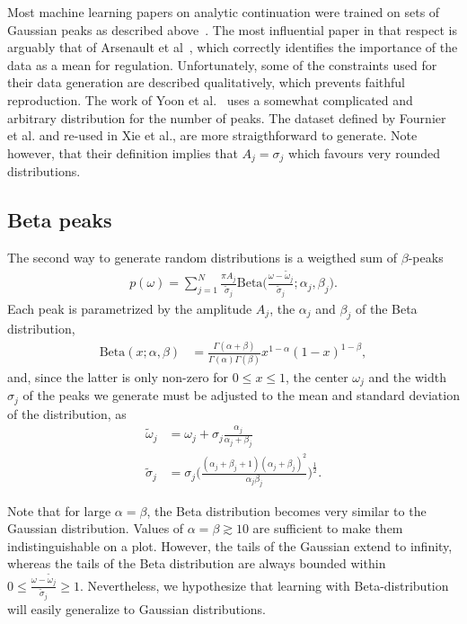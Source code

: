 \documentclass[notitlepage,11pt,nofootinbib]{revtex4-1}
\begin{document}
Most machine learning papers on analytic continuation were trained on sets of Gaussian peaks as described above~\cite{Arsenault2017, Yoon2018, Xie2019, Fournier2020}. The most influential paper in that respect is arguably that of Arsenault et al~\cite{Arsenault2017}, which correctly identifies the importance of the data as a mean for regulation. Unfortunately, some of the constraints used for their data generation are described qualitatively, which prevents faithful reproduction. The work of Yoon et al.~\cite{Yoon2018} uses a somewhat complicated and arbitrary distribution for the number of peaks. The dataset defined by Fournier et al.\cite{Fournier2020} and re-used in Xie et al.\cite{Xie2019}, are more straigthforward to generate. Note however, that their definition implies that $A_j=\sigma_j$ which favours very rounded distributions.


\subsection{Beta peaks}
The second way to generate random distributions is a weigthed sum of $\beta$-peaks
\begin{align}
p(\omega)
=
\sum_{j=1}^{N} 
\frac{\pi A_j}{\tilde{\sigma}_j}
\text{Beta}\bigg(
\frac{\omega-\tilde{\omega}_j}{\tilde{\sigma}_j}
;\alpha_j,\beta_j
\bigg).
\end{align}
Each peak is parametrized by the amplitude $A_j$, the $\alpha_j$ and $\beta_j$ of the Beta distribution,
\begin{align}
\text{Beta}(x;\alpha,\beta) 
&=
\frac{\Gamma(\alpha+\beta)}{\Gamma(\alpha)\Gamma(\beta)} x^{1-\alpha}(1-x)^{1-\beta},
\end{align}
and, since the latter is only non-zero for $0\leq x\leq 1$, the center $\omega_j$ and the width $\sigma_j$ of the peaks we generate must be adjusted to the mean and standard deviation of the distribution, as
\begin{align}
\tilde{\omega}_j
&=
\omega_j+\sigma_j
\frac{\alpha_j}{\alpha_j+\beta_j}
\\
\tilde{\sigma}_j
&=
\sigma_j
\bigg(
\frac
{(\alpha_j+\beta_j+1)(\alpha_j+\beta_j)^2}
{\alpha_j\beta_j}
\bigg)^{\frac{1}{2}}.
\end{align}

Note that for large $\alpha=\beta$, the Beta distribution becomes very similar to the Gaussian distribution. Values of $\alpha=\beta\gtrsim 10$ are sufficient to make them indistinguishable on a plot. However, the tails of the Gaussian extend to infinity, whereas the tails of the Beta distribution are always bounded within $0 \leq \frac{\omega-\tilde{\omega}_j}{\tilde{\sigma}_j} \geq 1$. Nevertheless, we hypothesize that learning with Beta-distribution will easily generalize to Gaussian distributions.
\end{document}
